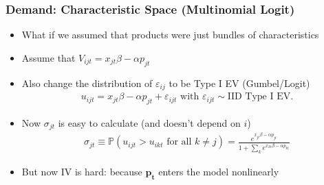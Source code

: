 \begin{frame}
\frametitle{Demand: Characteristic Space (Multinomial Logit)}

\begin{itemize}
    \item What if we assumed that products were just bundles of characteristics
    \item Assume that $V_{ijt} = x_{jt} \beta - \alpha p_{jt}$
    \item Also change the distribution of $\varepsilon_{ij}$ to be Type I EV (Gumbel/Logit)
    \begin{align*}
        u_{ijt} = x_{jt} \beta- \alpha p_{jt} +  \varepsilon_{ijt} \text{ with } \varepsilon_{ijt} \sim \text{IID Type I EV}.
    \end{align*}
    \item Now $\sigma_{jt}$ is easy to calculate (and doesn't depend on $i$)
     \begin{align*}
          \sigma_{jt} \equiv \mathbb{P}(u_{ijt} > u_{ikt} \text{ for all } k \neq j)  = 
    \frac{e^{x_{jt} \beta- \alpha p_{jt}}}{1+\sum_k e^{x_{kt} \beta- \alpha p_{kt} }}
    \end{align*}
    \item But now IV is hard: because $\symbf{p_t}$ enters the model \alert{nonlinearly}
\end{itemize}
\end{frame}





